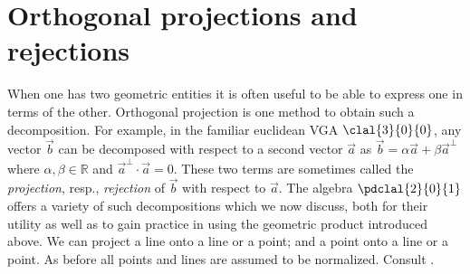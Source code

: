 \documentclass[12pt]{article}
\newcommand{\fvsh}[2]{\ifthenelse{\equal{\isFV}{true}}{#1}{#2}}
\newcommand{\mydisp}[2]{\ifthenelse{\equal{\isFV}{true}}{\[ #1\]}{$ #1 $#2}}
\begin{document}
%
% 
 


\section{Orthogonal projections and rejections}
\label{sec:orthpro}
When one has two geometric entities it is often useful to be able to express one in terms of the other. Orthogonal projection is one method to obtain such a decomposition. %
For example, in the familiar euclidean VGA $\clal{3}{0}{0}$, any vector $\vec{b}$ can be decomposed with respect to a second vector $\vec{a}$ as $\vec{b} = \alpha \vec{a} + \beta \vec{a}^\perp$ where $\alpha, \beta \in \mathbb{R}$ and $\vec{a}^\perp \cdot \vec{a} = 0$. These two terms are sometimes called the \emph{projection}, resp., \emph{rejection} of $\vec{b}$ with respect to $\vec{a}$.
The algebra $\pdclal{2}{0}{1}$ offers a variety of such decompositions which we now discuss, both for their utility as well as to gain practice in using the geometric product introduced above.  We can project a line onto a line or a point; and a point onto a line or a point.  As before all points and lines are assumed to be normalized.    Consult . 
\end{document}
